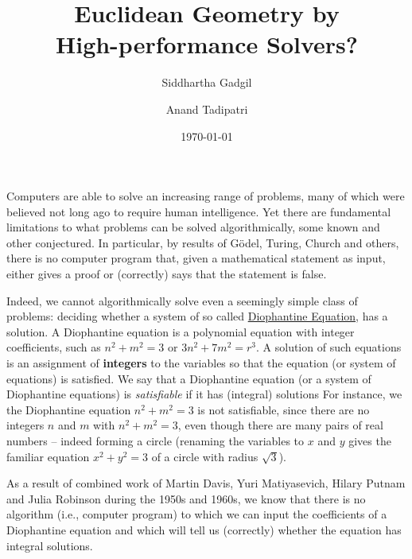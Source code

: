 \documentclass{amsart}
\theoremstyle{plain}
\theoremstyle{definition}
\theoremstyle{remark}
\begin{document}
\title{Euclidean Geometry by\\ High-performance Solvers?}
\date{\today}
\author{Siddhartha Gadgil}

\address{Department of Mathematics,\\
	Indian Institute of Science,\\
	Bangalore}

\author{Anand Tadipatri}
\address{Indian Institute of Science Education and Research,\\
	Pune}

\maketitle

Computers are able to solve an increasing range of problems, many of
which were believed not long ago to require human intelligence. Yet
there are fundamental limitations to what problems can be solved
algorithmically, some known and other conjectured. In particular, by
results of G\"odel, Turing, Church and others, there is no computer
program that, given a mathematical statement as input, either gives a
proof or (correctly) says that the statement is false.

Indeed, we cannot algorithmically solve even a seemingly simple class of
problems: deciding whether a system of so called
\href{https://en.wikipedia.org/wiki/Diophantine_equation}{Diophantine
	Equation}, has a solution. A Diophantine equation is a polynomial
equation with integer coefficients, such as $n^2 + m^2 = 3$ or \(3n^2 + 7m^2 = r^3\).
A solution of such equations is an assignment of \textbf{integers} to the variables so that
the equation (or system of equations) is satisfied.
We say that a Diophantine equation (or a system of Diophantine equations) is \emph{satisfiable}
if it has (integral) solutions
For
instance, we the Diophantine equation \(n^2 + m^2 = 3\) is not satisfiable,
since there are no integers $n$ and $m$ with \(n^2 + m^2 = 3\), even though there
are many pairs of real numbers -- indeed forming a circle (renaming the variables
to $x$ and $y$ gives the familiar equation $x^2+ y^2 =3$ of a circle with radius $\sqrt{3}$).

As a result of combined work of Martin Davis, Yuri Matiyasevich, Hilary
Putnam and Julia Robinson during the 1950s and 1960s, we know that there
is no algorithm (i.e., computer program) to which we can input the
coefficients of a Diophantine equation and which will tell us
(correctly) whether the equation has integral solutions.
\end{document}
